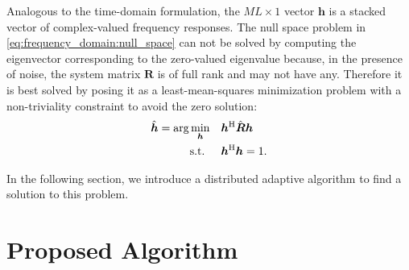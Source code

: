 \documentclass{article}
\newcommand{\hf}{{\bm{h}}}
\newcommand{\Rf}{{\bm{{R}}}}
\begin{document}
Analogous to the time-domain formulation, the \(ML \times 1\) vector \(\hf\) is a stacked vector of complex-valued frequency responses.
The null space problem in \eqref{eq:frequency_domain:null_space} can not be solved by computing the eigenvector corresponding to the zero-valued eigenvalue because, in the presence of noise, the system matrix \(\Rf\) is of full rank and may not have any.
Therefore it is best solved by posing it as a least-mean-squares minimization problem \cite{guanghanxuLeastsquaresApproachBlind1995,huangAdaptiveMultichannelLeast2002} with a non-triviality constraint to avoid the zero solution:
\begin{align}
    \hat{\hf} = \arg \min_{\hf} \quad &\hf^\herm \hat{\Rf} \hf \label{eq:frequency_domain:min_prob}\\
    \text{s.t. } \quad &\hf^\herm \hf = 1.
\end{align}

In the following section, we introduce a distributed adaptive algorithm to find a solution to this problem.

\section{Proposed Algorithm}
\label{sec:proposed_method}
\end{document}
